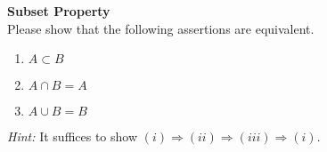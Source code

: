 \textbf{Subset Property}\\
Please show that the following assertions are equivalent.
	\begin{enumerate}
		\item $A \subset B$
		\item $A \cap B = A$
		\item $A \cup B = B$
	\end{enumerate}
	\textit{Hint: }It suffices to show $(i) \Rightarrow (ii) \Rightarrow (iii) \Rightarrow (i)$.